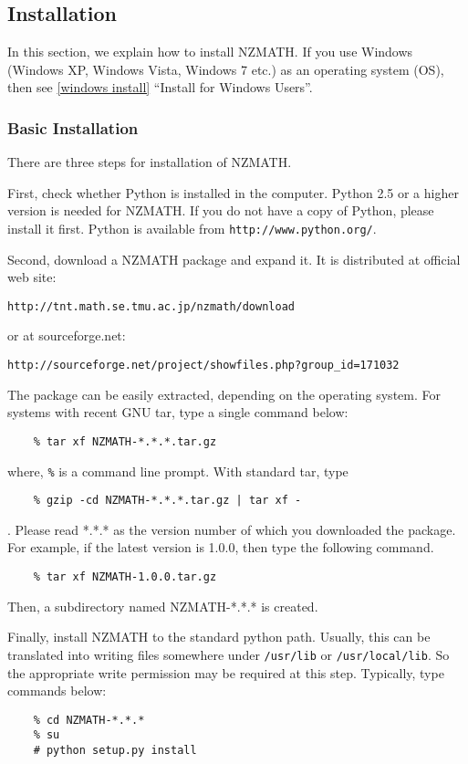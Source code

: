\subsection{Installation}\label{installation}
In this section, we explain how to install NZMATH.
If you use Windows (Windows XP, Windows Vista, Windows 7 etc.) 
as an operating system (OS), 
then see \ref{windows install} ``Install for Windows Users''.
%
\subsubsection{Basic Installation}
There are three steps for installation of NZMATH.

First, check whether Python is installed in the computer.
Python 2.5 or a higher version is needed for NZMATH.
If you do not have a copy of Python, please install it first.
Python is available from \verb+http://www.python.org/+.

Second, download a NZMATH package and expand it.
It is distributed at official web site:
\begin{verbatim}
http://tnt.math.se.tmu.ac.jp/nzmath/download
\end{verbatim}
or at sourceforge.net:
\begin{verbatim}
http://sourceforge.net/project/showfiles.php?group_id=171032
\end{verbatim}
The package can be easily extracted, depending on the operating system.
For systems with recent GNU tar, type a single command below:
\begin{verbatim}
    % tar xf NZMATH-*.*.*.tar.gz
\end{verbatim}
where, \verb|%| is a command line prompt. 
With standard tar, type 
\begin{verbatim}
    % gzip -cd NZMATH-*.*.*.tar.gz | tar xf -
\end{verbatim}.
Please read *.*.* as the version number of which you downloaded the package.
For example, if the latest version is 1.0.0, then type the following command.
\begin{verbatim}
    % tar xf NZMATH-1.0.0.tar.gz
\end{verbatim}
Then, a subdirectory named NZMATH-*.*.* is created.

Finally, install NZMATH to the standard python path.
Usually, this can be translated into writing files somewhere 
under \verb+/usr/lib+ or \verb+/usr/local/lib+. 
So the appropriate write permission may be required at this step.
Typically, type commands below:
\begin{verbatim}
    % cd NZMATH-*.*.*
    % su
    # python setup.py install
\end{verbatim}

